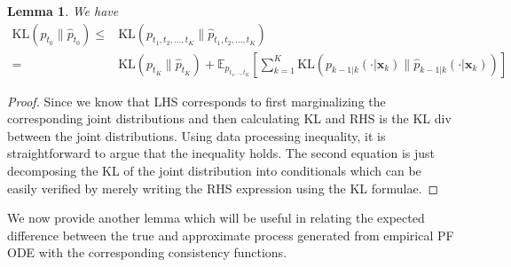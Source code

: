 \documentclass[11pt]{article}
\def\rvx{{\mathbf{x}}}
\newcommand{\E}{\mathbb{E}}
\newcommand{\KL}[2]{\mathrm{KL}\left(#1 \big\| #2\right)}
\newtheorem{lemma}{Lemma}[section]
\begin{document}
\vspace{0.2in}
\begin{lemma}
\label{lemma_second_KL_data_processing_ineq}
  We have
  \begin{align*}
    \KL{{p}_{t_0}}{\hat{p}_{t_0}}
    \leq & \KL{{p}_{t_1, t_2, ..., t_{K}}}{\hat{p}_{t_1, t_2, ..., t_{K}}}\\
    =& \KL{{p}_{t_K}}{\hat{p}_{t_K}} + 
   \E_{{p}_{t_1,..,t_{K}}} \left[ \sum_{k=1}^K
       \KL{{p}_{k-1|k}(\cdot|{\rvx}_{k})}{\hat{p}_{k-1|k}(\cdot|{\rvx}_k)}\right]
  \end{align*}
\end{lemma}
\begin{proof}
Since we know that LHS corresponds to first marginalizing the corresponding joint distributions and then calculating KL and RHS is the KL div between the joint distributions. Using data processing inequality, it is straightforward to argue that the inequality holds. The second equation is just decomposing the KL of the joint distribution into conditionals which can be easily verified by merely writing the RHS expression using the KL formulae. 
\end{proof}

\noindent
We now provide another lemma which will be useful in relating the expected difference between the true and approximate process generated from empirical PF ODE with the corresponding consistency functions.
\end{document}
